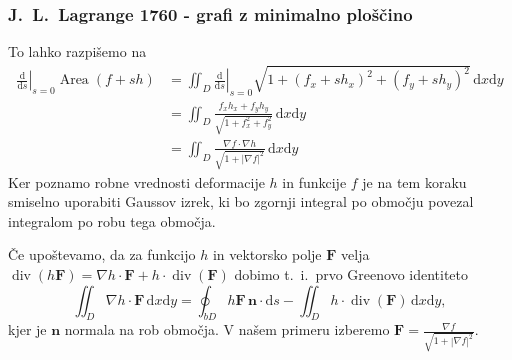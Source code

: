 \documentclass[8pt]{beamer}
\theoremstyle{definition}
\theoremstyle{remark}
\theoremstyle{plain}
\numberwithin{equation}{section}  %
\begin{document}
\begin{frame}
    \frametitle{J.~L.~Lagrange 1760 - grafi z minimalno ploščino}

    To lahko razpišemo na
    \begin{align*}
        \left.\frac{\mathrm{d}}{\mathrm{d} s}\right|_{s=0} \operatorname{Area}(f+s h) & =\left.\iint_{D} \frac{\mathrm{d}}{\mathrm{d} s}\right|_{s=0} \sqrt{1+\left(f_x+s h_x\right)^2+\left(f_y+s h_y\right)^2} \, \mathrm{d} x \mathrm{d} y \\
        & =\iint_{D} \frac{f_x h_x+f_y h_y}{\sqrt{1+f_x^2+f_y^2}} \, \mathrm{d} x \mathrm{d} y \\
        & =\iint_{D} \frac{\nabla f \cdot \nabla h}{\sqrt{1+|\nabla f|^2}} \, \mathrm{d} x \mathrm{d} y
    \end{align*}
    Ker poznamo robne vrednosti deformacije $h$ in funkcije $f$ je na tem koraku smiselno uporabiti Gaussov izrek, ki bo zgornji integral po območju povezal integralom po robu tega območja. 

    \vspace{0.8em}

    Če upoštevamo, da za funkcijo $h$ in vektorsko polje $\mathbf{F}$ velja $\operatorname{div}(h \mathbf{F})=\nabla h \cdot \mathbf{F}+h \cdot \operatorname{div}(\mathbf{F})$ dobimo t.~i.~prvo Greenovo identiteto
    \begin{equation*}
        \iint_{D} \nabla h \cdot \mathbf{F} \, \mathrm{d} x \mathrm{d} y=\oint_{b D} h \mathbf{F} \, \mathbf{n} \cdot \mathrm{d} s-\iint_{D} h \cdot \operatorname{div}(\mathbf{F}) \, \mathrm{d} x \mathrm{d} y,
    \end{equation*}
    kjer je $\mathbf{n}$ normala na rob območja. V našem primeru izberemo $\mathbf{F}=\frac{\nabla f}{\sqrt{1+|\nabla f|^2}}$.

\end{frame}
\end{document}
